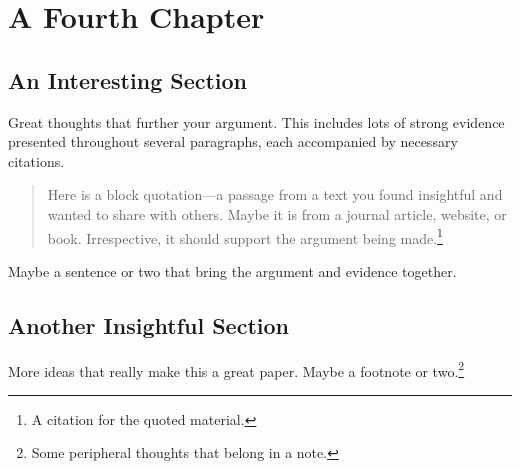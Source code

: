 \chapter{A Fourth Chapter}


\section{An Interesting Section}

Great thoughts that further your argument. This includes lots of strong evidence presented throughout several paragraphs, each accompanied by necessary citations.
\begin{quotation}
    \noindent Here is a block quotation---a passage from a text you found insightful and wanted to share with others. Maybe it is from a journal article, website, or book. Irrespective, it should support the argument being made.\footnote{A citation for the quoted material.}
\end{quotation}
Maybe a sentence or two that bring the argument and evidence together.\citep{dos_santos_2020}



\section{Another Insightful Section}

More ideas that really make this a great paper. Maybe a footnote or two.\footnote{Some peripheral thoughts that belong in a note.}
